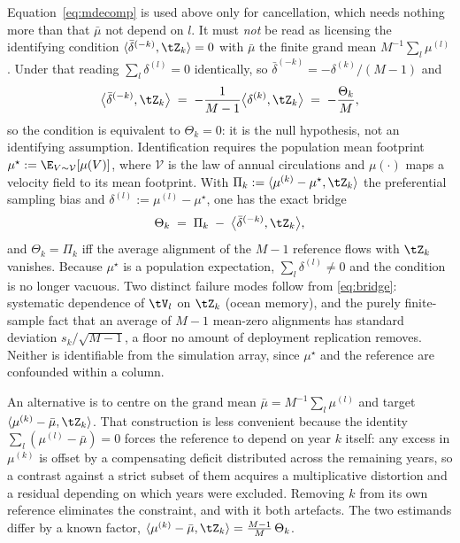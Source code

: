 \begin{remark}
\label{rem:identification}
Equation~\eqref{eq:mdecomp} is used above only for cancellation, which needs nothing more than that
$\bar{\mu}$ not depend on $l$. It must \emph{not} be read as licensing the identifying condition
$\langle \bar{\delta}^{(-k)}, \tZ_k\rangle = 0$ with $\bar{\mu}$ the finite grand mean
$M^{-1}\sum_l \mu^{(l)}$. Under that reading $\sum_l \delta^{(l)} = 0$ identically, so
$\bar{\delta}^{(-k)} = -\delta^{(k)}/(M-1)$ and
\begin{equation}
  \big\langle \bar{\delta}^{(-k)}, \tZ_k\big\rangle
  \;=\; -\frac{1}{M-1}\big\langle \delta^{(k)}, \tZ_k\big\rangle
  \;=\; -\frac{\Theta_k}{M},
\end{equation}
so the condition is equivalent to $\Theta_k = 0$: it is the null hypothesis, not an identifying
assumption. Identification requires the population mean footprint
$\mu^{\star} := \E_{V\sim\mathcal{V}}[\mu(V)]$, where $\mathcal{V}$ is the law of annual
circulations and $\mu(\cdot)$ maps a velocity field to its mean footprint. With
$\Pi_k := \langle \mu^{(k)} - \mu^{\star}, \tZ_k\rangle$ the preferential sampling bias and
$\delta^{(l)} := \mu^{(l)} - \mu^{\star}$, one has the exact bridge
\begin{equation}
  \label{eq:bridge}
  \Theta_k \;=\; \Pi_k \;-\; \big\langle \bar{\delta}^{(-k)}, \tZ_k\big\rangle ,
\end{equation}
and $\Theta_k = \Pi_k$ iff the average alignment of the $M-1$ reference flows with $\tZ_k$ vanishes.
Because $\mu^{\star}$ is a population expectation, $\sum_l \delta^{(l)} \neq 0$ and the condition is
no longer vacuous. Two distinct failure modes follow from \eqref{eq:bridge}: systematic dependence
of $\tV_l$ on $\tZ_k$ (ocean memory), and the purely finite-sample fact that an average of $M-1$
mean-zero alignments has standard deviation $s_k/\sqrt{M-1}$, a floor no amount of deployment
replication removes. Neither is identifiable from the simulation array, since $\mu^{\star}$ and the
reference are confounded within a column.
\end{remark}

\begin{remark}
\label{rem:whyexclude}
An alternative is to centre on the grand mean $\bar{\mu} = M^{-1}\sum_{l} \mu^{(l)}$ and target
$\langle \mu^{(k)} - \bar{\mu}, \tZ_k\rangle$. That construction is less convenient because the
identity $\sum_{l}(\mu^{(l)} - \bar{\mu}) = 0$ forces the reference to depend on year $k$ itself: any
excess in $\mu^{(k)}$ is offset by a compensating deficit distributed across the remaining years, so
a contrast against a strict subset of them acquires a multiplicative distortion and a residual
depending on which years were excluded. Removing $k$ from its own reference eliminates the
constraint, and with it both artefacts. The two estimands differ by a known factor,
$\langle \mu^{(k)} - \bar \mu, \tZ_k\rangle = \tfrac{M-1}{M}\,\Theta_k$.
\end{remark}

